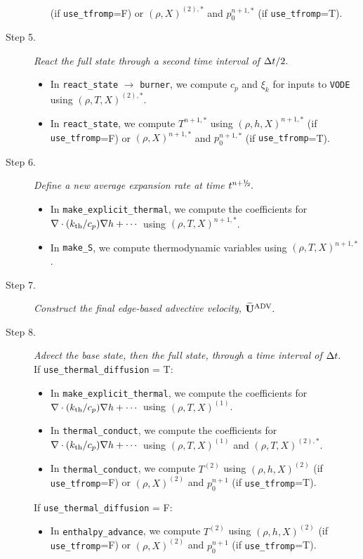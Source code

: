 \begin{description}
\begin{itemize}
(if {\tt use\_tfromp}=F) or $(\rho,X)^{(2),*}$ and $p_0^{n+1,*}$ (if {\tt use\_tfromp}=T).
\end{itemize}
\item[Step 5.] {\em React the full state through a second time interval of $\Delta t/2.$}
\begin{itemize}
\item In {\tt react\_state} $\rightarrow$ {\tt burner}, we compute $c_p$ and $\xi_k$ 
for inputs to {\tt VODE} using $(\rho,T,X)^{(2),*}$.
\item In {\tt react\_state}, we compute $T^{n+1,*}$ using $(\rho,h,X)^{n+1,*}$ 
(if {\tt use\_tfromp}=F) or $(\rho,X)^{n+1,*}$ and $p_0^{n+1,*}$ (if {\tt use\_tfromp}=T).
\end{itemize}
\item[Step 6.] {\em Define a new average expansion rate at time $t^\nph.$}
\begin{itemize}
\item In {\tt make\_explicit\_thermal}, we compute the coefficients for 
$\nabla\cdot(k_{\rm th}/c_p)\nabla h + \cdots$ using $(\rho,T,X)^{n+1,*}$.
\item In {\tt make\_S}, we compute thermodynamic variables using $(\rho,T,X)^{n+1,*}$.
\end{itemize}
\item[Step 7.] {\em Construct the final edge-based advective velocity, $\widetilde{\mathbf{U}}^{\mathrm{ADV}}.$}
\item[Step 8.] {\em Advect the base state, then the full state, through a time interval 
of $\Delta t.$}\\
If {\tt use\_thermal\_diffusion} = T:
\begin{itemize}
\item In {\tt make\_explicit\_thermal}, we compute the coefficients for 
$\nabla\cdot(k_{\rm th}/c_p)\nabla h + \cdots$ using $(\rho,T,X)^{(1)}$.
\item In {\tt thermal\_conduct}, we compute the coefficients for 
$\nabla\cdot(k_{\rm th}/c_p)\nabla h + \cdots$ using $(\rho,T,X)^{(1)}$ and $(\rho,T,X)^{(2),*}$.
\item In {\tt thermal\_conduct}, we compute $T^{(2)}$ using $(\rho,h,X)^{(2)}$
(if {\tt use\_tfromp}=F) or $(\rho,X)^{(2)}$ and $p_0^{n+1}$ (if {\tt use\_tfromp}=T).
\end{itemize}
If {\tt use\_thermal\_diffusion} = F:
\begin{itemize}
\item In {\tt enthalpy\_advance}, we compute $T^{(2)}$ using $(\rho,h,X)^{(2)}$
(if {\tt use\_tfromp}=F) or $(\rho,X)^{(2)}$ and $p_0^{n+1}$ (if {\tt use\_tfromp}=T).

\end{itemize}
\end{description}
